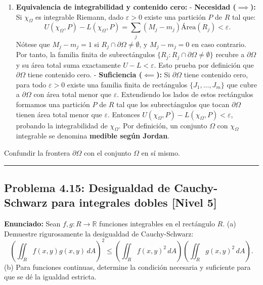 \documentclass[11pt,a4paper]{article}
\begin{document}
\begin{enumerate}[label=\textbf{\arabic*.}]
\item \textbf{Equivalencia de integrabilidad y contenido cero:}
- \textbf{Necesidad ($\implies$):}
Si $\chi_\Omega$ es integrable Riemann, dado $\varepsilon > 0$ existe una partición $P$ de $R$ tal que:
\begin{equation*}
U(\chi_\Omega, P) - L(\chi_\Omega, P) = \sum_{j} (M_j - m_j)\text{Área}(R_j) < \varepsilon.
\end{equation*}
Nótese que $M_j - m_j = 1$ si $R_j \cap \partial \Omega \neq \emptyset$, y $M_j - m_j = 0$ en caso contrario.
Por tanto, la familia finita de subrectángulos $\{R_j : R_j \cap \partial \Omega \neq \emptyset\}$ recubre a $\partial \Omega$ y su área total suma exactamente $U - L < \varepsilon$.
Esto prueba por definición que $\partial \Omega$ tiene contenido cero.
- \textbf{Suficiencia ($\impliedby$):}
Si $\partial \Omega$ tiene contenido cero, para todo $\varepsilon > 0$ existe una familia finita de rectángulos $\{J_1, \dots, J_m\}$ que cubre a $\partial \Omega$ con área total menor que $\varepsilon$.
Extendiendo los lados de estos rectángulos formamos una partición $P$ de $R$ tal que los subrectángulos que tocan $\partial \Omega$ tienen área total menor que $\varepsilon$.
Entonces $U(\chi_\Omega, P) - L(\chi_\Omega, P) < \varepsilon$, probando la integrabilidad de $\chi_\Omega$.
Por definición, un conjunto $\Omega$ con $\chi_\Omega$ integrable se denomina \textbf{medible según Jordan}.
\end{enumerate}

\begin{trapbox}
Confundir la frontera $\partial \Omega$ con el conjunto $\Omega$ en sí mismo.
\end{trapbox}

\vspace{0.5cm}
\hrule
\vspace{0.5cm}

\subsection*{Problema 4.15: Desigualdad de Cauchy-Schwarz para integrales dobles \hfill \color{primaryblue}\small[Nivel 5]}

\begin{tcolorbox}[colback=white,colframe=gray!40,arc=1mm,boxrule=0.5pt,left=3mm,right=3mm,top=2mm,bottom=2mm]
\textbf{Enunciado:} Sean $f, g: R \to \mathbb{R}$ funciones integrables en el rectángulo $R$. (a) Demuestre rigurosamente la desigualdad de Cauchy-Schwarz:
\begin{equation*}
\left( \iint_R f(x,y) g(x,y) \, dA \right)^2 \le \left( \iint_R f(x,y)^2 \, dA \right) \left( \iint_R g(x,y)^2 \, dA \right).
\end{equation*}
(b) Para funciones continuas, determine la condición necesaria y suficiente para que se dé la igualdad estricta.
\end{tcolorbox}
\end{document}
